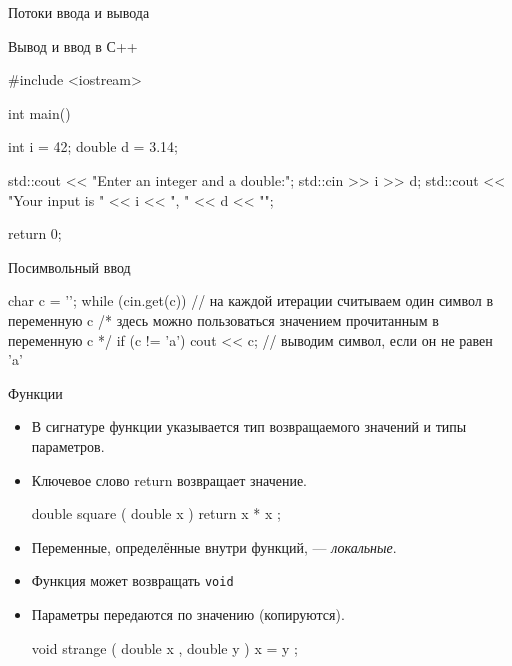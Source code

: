 \documentclass[
    9pt,
    hyperref={pdfencoding=unicode}
    ]{beamer}
\begin{document}
\begin{frame}[fragile]{Потоки ввода и вывода}
      
    Вывод и ввод в С++ 
    \begin{cppcode}
        #include <iostream>
        
        int main()
        {
            int i = 42;
            double d = 3.14;
            
            std::cout << "Enter an integer and a double:\n";
            std::cin >> i >> d;
            std::cout << "Your input is " << i << ", " << d << "\n";
            
            return 0;
        }
    \end{cppcode}   
\end{frame}

\begin{frame}[fragile]{Посимвольный ввод}
    \begin{cppcode}
        char c = '\0';
        while (cin.get(c)) { // на каждой итерации считываем один символ в переменную c
            /* здесь можно пользоваться значением прочитанным в переменную c */
            if (c != 'a')
            cout << c; // выводим символ, если он не равен 'a'
        }
    \end{cppcode}   
\end{frame}

\begin{frame}[fragile]{Функции}
    \begin{itemize}
        \item В сигнатуре функции указывается тип возвращаемого
        значений и типы параметров.
        \item Ключевое слово return возвращает значение.

        \begin{cppcode}
            double square ( double x ) {
                return x * x ;
            }

        \end{cppcode}
        \item Переменные, определённые внутри функций, — \emph{локальные}.
        \item Функция может возвращать \texttt{void}
        \item Параметры передаются по значению (копируются).
        \begin{cppcode}
            void strange ( double x , double y ) {
                x = y ;
            }

        \end{cppcode}
    \end{itemize}
\end{frame}
\end{document}
